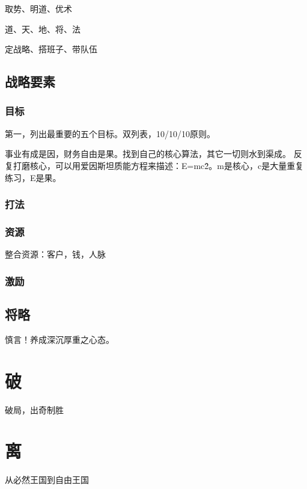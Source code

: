 取势、明道、优术

道、天、地、将、法

定战略、搭班子、带队伍

\subsection{战略要素}

\subsubsection{目标}

第一，列出最重要的五个目标。双列表，10/10/10原则。

事业有成是因，财务自由是果。找到自己的核心算法，其它一切则水到渠成。
反复打磨核心，可以用爱因斯坦质能方程来描述：E=mc\^2。m是核心，c是大量重复练习，E是果。

\subsubsection{打法}

\subsubsection{资源}

整合资源：客户，钱，人脉

\subsubsection{激励}

\subsection{将略}

慎言！养成深沉厚重之心态。

\section{破}

破局，出奇制胜

\section{离}

从必然王国到自由王国
